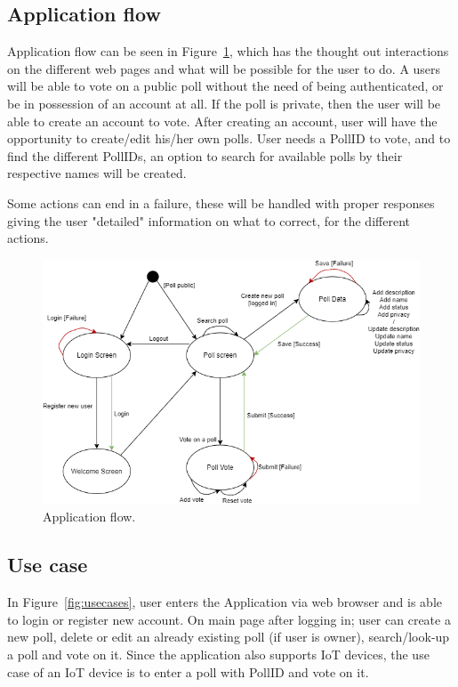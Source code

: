 \subsection{Application flow}
\label{sub:appflow}
Application flow can be seen in Figure~\ref{fig:applicationflow}, which has the thought out interactions on the different web pages and what will be possible for the user to do. A users will be able to vote on a public poll without the need of being authenticated, or be in possession of an account at all. If the poll is private, then the user will be able to create an account to vote. After creating an account, user will have the opportunity to create/edit his/her own polls. User needs a PollID to vote, and to find the different PollIDs, an option to search for available polls by their respective names will be created. 

Some actions can end in a failure, these will be handled with proper responses giving the user "detailed" information on what to correct, for the different actions.
\begin{figure}[H]
  \centering
  \includegraphics[scale=0.5]{figs/applicationflow.png}
  \caption[scale=0.5]{Application flow.}
  \label{fig:applicationflow}
\end{figure}

\subsection{Use case}
\label{sub:usecase}
In Figure~\ref{fig:usecases}, user enters the Application via web browser and is able to login or register new account. On main page after logging in; user can create a new poll, delete or edit an already existing poll (if user is owner), search/look-up a poll and vote on it. Since the application also supports IoT devices, the use case of an IoT device is to enter a poll with PollID and vote on it.

